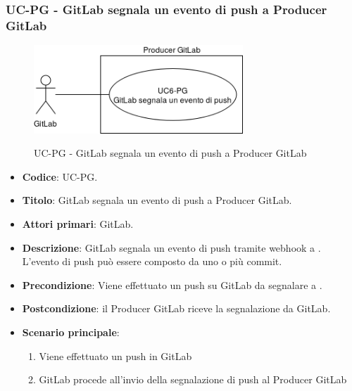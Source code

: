 \subsubsection{UC\theuccount-PG - GitLab segnala un evento di push a Producer GitLab}
	\begin{figure}[H]
		\centering
		\includegraphics[width=0.7\textwidth]{img/casi_d'uso/UC6.png}\\
		\caption{UC\theuccount-PG - GitLab segnala un evento di push a Producer GitLab}
	\end{figure}
	\begin{itemize}
		\item \textbf{Codice}: UC\theuccount-PG.
		\item \textbf{Titolo}: GitLab segnala un evento di push a Producer GitLab.
		\item \textbf{Attori primari}: GitLab.
		\item \textbf{Descrizione}: GitLab segnala un evento di push tramite webhook a \progetto. L'evento di	push può essere composto da uno o più commit.
		\item \textbf{Precondizione}: Viene effettuato un push su GitLab da segnalare a \progetto.
		\item \textbf{Postcondizione}: il Producer GitLab riceve la segnalazione da GitLab.
		\item \textbf{Scenario principale}: 
		\begin{enumerate}
			\item Viene effettuato un push in GitLab
			\item GitLab procede all'invio della segnalazione di push al Producer GitLab
		\end{enumerate}
		
	\end{itemize}